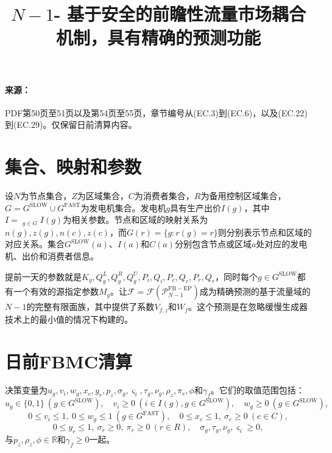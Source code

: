 \documentclass{article}
\begin{document}
\title{$N-1$- 基于安全的前瞻性流量市场耦合机制，具有精确的预测功能}
\date{}
\maketitle

\paragraph{来源：} PDF第50页至51页以及第54页至55页，章节编号从(EC.3)到(EC.6)，以及(EC.22)到(EC.29)。仅保留日前清算内容。
\section*{集合、映射和参数}
设$N$为节点集合，$Z$为区域集合，$C$为消费者集合，$R$为备用控制区域集合，$G=G^{\mathrm{SLOW}}\mathbin{\dot\cup}G^{\mathrm{FAST}}$为发电机集合。发电机$g$具有生产出价$I(g)$，其中$I=\mathop{\dot\bigcup}_{g\in G}I(g)$为相关参数。节点和区域的映射关系为$n(g),z(g),n(c),z(c)$，而$G(r)=\{g:r(g)=r\}$则分别表示节点和区域的对应关系。集合$G^{\mathrm{SLOW}}(a)$、$I(a)$和$C(a)$分别包含节点或区域$a$处对应的发电机、出价和消费者信息。

提前一天的参数就是$K_g,Q_g^L,Q_g^R,Q_g^U,P_i,Q_i,P_c,Q_c,P_r,Q_r$，同时每个$g\in G^{\mathrm{SLOW}}$都有一个有效的源指定参数$M_g$。让$\mathcal F=\mathcal F(\mathcal P_{N-1}^{\mathrm{FB-EP}})$成为精确预测的基于流量域的$N-1$的完整有限面族，其中提供了系数$V_{f,z}$和$W_f$。这个预测是在忽略缓慢生成器技术上的最小值的情况下构建的。

\section*{日前FBMC清算}
决策变量为$u_g,v_i,w_g,x_c,y_r,p_z,\sigma_g,\varsigma_i,\tau_g,\nu_g,\rho_z,\pi_r,\phi$和$\gamma_f$。它们的取值范围包括：
\[
 u_g\in\{0,1\}\ (g\in G^{\mathrm{SLOW}}),\quad v_i\geq0\ (i\in I(g),g\in G^{\mathrm{SLOW}}),\quad w_g\geq0\ (g\in G^{\mathrm{SLOW}}),
\]
\[
0\leq v_i\leq1,\ 0\leq w_g\leq1\ (g\in G^{\mathrm{FAST}}),\quad0\leq x_c\leq1,\ \sigma_c\geq0\ (c\in C),
\]
\[
0\leq y_r\leq1,\ \sigma_r\geq0,\ \pi_r\geq0\ (r\in R),\quad \sigma_g,\tau_g,\nu_g,\varsigma_i\geq0,
\]
与$p_z,\rho_z,\phi\in\mathbb R$和$\gamma_f\geq0$一起。
\end{document}
